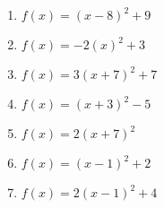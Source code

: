 \documentclass{article}%
\begin{document}
\begin{enumerate}[label=\alph*)]
\item%
\newline\vspace{0.5cm} $f(x)=(x-8)^2 +9$%
\item%
\newline\vspace{0.5cm} $f(x)=-2(x)^2 +3$%
\item%
\newline\vspace{0.5cm} $f(x)=3(x+7)^2 +7$%
\item%
\newline\vspace{0.5cm} $f(x)=(x+3)^2 -5$%
\item%
\newline\vspace{0.5cm} $f(x)=2(x+7)^2$%
\item%
\newline\vspace{0.5cm} $f(x)=(x-1)^2 +2$%
\item%
\newline\vspace{0.5cm} $f(x)=2(x-1)^2 +4$%
\end{enumerate}

%
\end{document}
